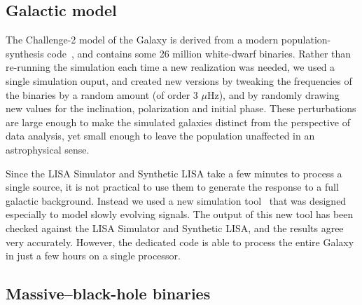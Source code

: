 \documentclass{iopart}
\begin{document}
\subsection{Galactic model}
\label{ss:galaxy}

The Challenge-2 model of the Galaxy is derived from a modern population-synthesis code~\cite{gijs}, and contains some 26 million white-dwarf binaries. Rather than re-running the simulation each time a new realization was needed, we used a single simulation ouput, and created
new versions by tweaking the frequencies of the binaries by a random amount (of order 3 $\mu$Hz),
and by randomly drawing new values for the inclination, polarization and initial phase. These perturbations are large enough to make the
simulated galaxies distinct from the perspective of data analysis, yet small enough to leave the population unaffected in an astrophysical sense. 

Since the LISA Simulator and Synthetic LISA take a few minutes to process a single source, it is not practical to use them to generate the response to a full galactic background. Instead we used a new simulation tool~\cite{cornishlittenberg} that was designed especially to model slowly evolving signals. The output of this new tool has been checked against the LISA Simulator and Synthetic LISA, and the results agree very accurately. However, the dedicated code is able to process the entire Galaxy in just a few hours on a single processor.

\subsection{Massive--black-hole binaries}
\end{document}
